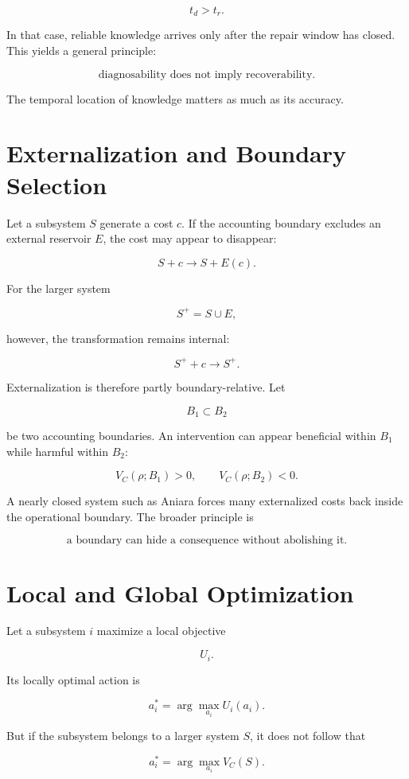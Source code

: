 \documentclass[11pt,oneside]{book}
\theoremstyle{definition}
\theoremstyle{remark}
\begin{document}
\[
t_d>t_r.
\]

In that case, reliable knowledge arrives only after the repair window has closed. This yields a
general principle:

\[
\boxed{ \text{diagnosability does not imply recoverability}. }
\]

The temporal location of knowledge matters as much as its accuracy.

\section{Externalization and Boundary Selection}

Let a subsystem \(S\) generate a cost \(c\). If the accounting boundary excludes an external
reservoir \(E\), the cost may appear to disappear:

\[
S+c \rightarrow S+E(c).
\]

For the larger system

\[
S^{+}=S\cup E,
\]

however, the transformation remains internal:

\[
S^{+}+c \rightarrow S^{+}.
\]

Externalization is therefore partly boundary-relative. Let

\[
B_1\subset B_2
\]

be two accounting boundaries. An intervention can appear beneficial within \(B_1\) while harmful
within \(B_2\):

\[
V_C(\rho;B_1)>0, \qquad V_C(\rho;B_2)<0.
\]

A nearly closed system such as Aniara forces many externalized costs back inside the operational
boundary. The broader principle is

\[
\boxed{ \text{a boundary can hide a consequence without abolishing it}. }
\]

\section{Local and Global Optimization}

Let a subsystem \(i\) maximize a local objective

\[
U_i.
\]

Its locally optimal action is

\[
a_i^* = \arg\max_{a_i}U_i(a_i).
\]

But if the subsystem belongs to a larger system \(S\), it does not follow that

\[
a_i^* = \arg\max_{a_i}V_C(S).
\]
\end{document}
